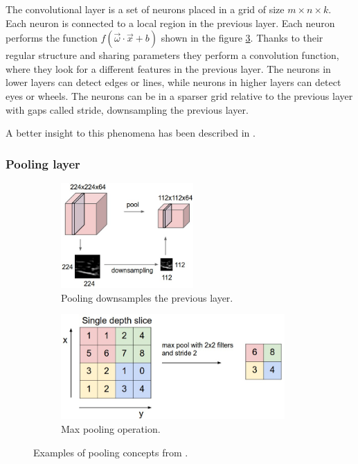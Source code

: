 \documentclass[a4paper,12pt,titlepage, twoside]{article}
\numberwithin{figure}{section}
\begin{document}
The convolutional layer is a set of neurons placed in a grid of size $m \times n \times k$. Each neuron is connected to a local region in the previous layer. Each neuron performs the function $f(\overrightarrow{\omega} \cdot \overrightarrow{x} + b)$ shown in the figure \ref{fig:neuron}. Thanks to their regular structure and sharing parameters they perform a convolution function, where they look for a different features in the previous layer. The neurons in lower layers can detect edges or lines, while neurons in higher layers can detect eyes or wheels. The neurons can be in a sparser grid relative to the previous layer with gaps called stride, downsampling the previous layer. 

A better insight to this phenomena has been described in \cite{zeiler2014visualizing}.

\subsubsection{Pooling layer}
\begin{figure}[h!]
    \begin{subfigure}[Sample1]{0.5\linewidth}
    	\includegraphics[height=40mm]{fig/pool1.jpeg} 
        \caption{Pooling downsamples the previous layer.}
        \label{fig:conv_layer}
    \end{subfigure}
    \begin{subfigure}[Sample1]{0.5\linewidth} 
    	\includegraphics[height=40mm]{fig/pool2.jpeg}
        \caption{Max pooling operation.}   
        \label{fig:neuron}
    \end{subfigure} 
    \caption{Examples of pooling concepts from \cite{karpathy2016cs231n}.}
\end{figure}
\end{document}
